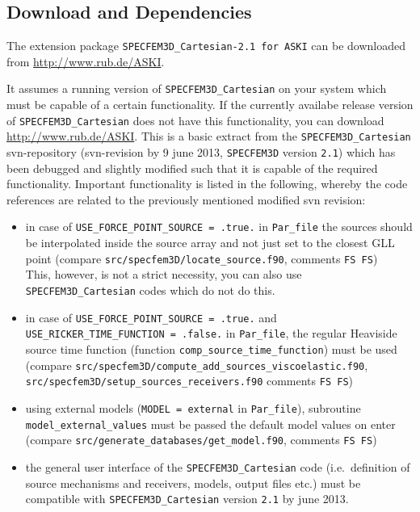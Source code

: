 \documentclass[12pt,a4paper]{article}
\newcommand{\lcode}[1]{\nolinkurl{#1}}
\begin{document}
\subsection{Download and Dependencies} \label{extent_to_ASKI,sub:download_dependencies}
%
The extension package \lcode{SPECFEM3D_Cartesian-2.1 for ASKI} can be downloaded from 
\url{http://www.rub.de/ASKI}.

It assumes a running version of \lcode{SPECFEM3D_Cartesian} on your system which must be capable of a 
certain functionality. If the currently availabe release version of \lcode{SPECFEM3D_Cartesian} does not have 
this functionality, you can download \url{http://www.rub.de/ASKI}. 
This is a basic extract from the \lcode{SPECFEM3D_Cartesian} svn-repository (svn-revision by 9 june 2013, 
\lcode{SPECFEM3D} version \lcode{2.1}) which has been debugged and slightly modified such that it is capable of the 
required functionality. Important functionality is listed in the following, whereby the code references are related 
to the previously mentioned modified svn revision:
\begin{itemize}
\item in case of \lcode{USE_FORCE_POINT_SOURCE = .true.} in \lcode{Par_file} the sources should be interpolated inside the 
  source array and not just set to the closest GLL point (compare \lcode{src/specfem3D/locate_source.f90}, comments \lcode{FS FS})\\
  This, however, is not a strict necessity, you can also use \lcode{SPECFEM3D_Cartesian} codes which do not do this.
%
\item in case of \lcode{USE_FORCE_POINT_SOURCE = .true.} and \\
  \lcode{USE_RICKER_TIME_FUNCTION = .false.} in 
  \lcode{Par_file}, the regular Heaviside source time function (function \lcode{comp_source_time_function}) must
  be used (compare \lcode{src/specfem3D/compute_add_sources_viscoelastic.f90}, \lcode{src/specfem3D/setup_sources_receivers.f90} 
  comments \lcode{FS FS})
%
\item using external models (\lcode{MODEL = external} in \lcode{Par_file}), subroutine \lcode{model_external_values} must 
  be passed the default model values on enter (compare \lcode{src/generate_databases/get_model.f90}, comments \lcode{FS FS})
%
\item the general user interface of the \lcode{SPECFEM3D_Cartesian} code (i.e.\ definition of source mechanisms and receivers, 
  models, output files etc.) must be compatible with \lcode{SPECFEM3D_Cartesian} version \lcode{2.1} by june 2013.
\end{itemize}
%
\end{document}
